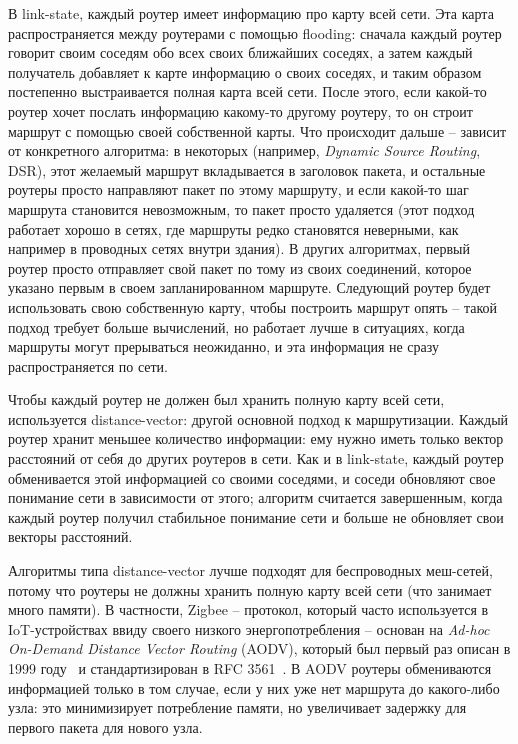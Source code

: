 \documentclass[%
]{report}
\begin{document}
В link-state, каждый роутер имеет информацию про карту всей сети.
Эта карта распространяется между роутерами с помощью flooding:
сначала каждый роутер говорит своим соседям обо всех своих ближайших соседях,
а затем каждый получатель добавляет к карте информацию о своих соседях,
и таким образом постепенно выстраивается полная карта всей сети.
После этого, если какой-то роутер хочет послать информацию какому-то другому роутеру,
то он строит маршрут с помощью своей собственной карты.
Что происходит дальше -- зависит от конкретного алгоритма:
в некоторых (например, \emph{Dynamic Source Routing}, DSR), этот желаемый маршрут вкладывается в заголовок пакета,
и остальные роутеры просто направляют пакет по этому маршруту,
и если какой-то шаг маршрута становится невозможным, то пакет просто удаляется
(этот подход работает хорошо в сетях, где маршруты редко становятся неверными,
как например в проводных сетях внутри здания).
В других алгоритмах, первый роутер просто отправляет свой пакет
по тому из своих соединений, которое указано первым в своем запланированном маршруте.
Следующий роутер будет использовать свою собственную карту, чтобы построить маршрут опять -- 
такой подход требует больше вычислений,
но работает лучше в ситуациях, когда маршруты могут прерываться неожиданно,
и эта информация не сразу распространяется по сети.

Чтобы каждый роутер не должен был хранить полную карту всей сети,
используется distance-vector: другой основной подход к маршрутизации.
Каждый роутер хранит меньшее количество информации:
ему нужно иметь только вектор расстояний от себя до других роутеров в сети.
Как и в link-state, каждый роутер обменивается этой информацией со своими соседями,
и соседи обновляют свое понимание сети в зависимости от этого;
алгоритм считается завершенным, когда каждый роутер получил стабильное понимание сети
и больше не обновляет свои векторы расстояний.

Алгоритмы типа distance-vector лучше подходят для беспроводных меш-сетей,
потому что роутеры не должны хранить полную карту всей сети (что занимает много памяти).
В частности, Zigbee -- протокол, который часто используется в IoT-устройствах ввиду своего низкого
энергопотребления --
основан на \emph{Ad-hoc On-Demand Distance Vector Routing} (AODV),
который был первый раз описан в 1999 году~\cite{perkins1999aodv}
и стандартизирован в RFC 3561~\cite{rfc3561}.
В AODV роутеры обмениваются информацией только в том случае,
если у них уже нет маршрута до какого-либо узла:
это минимизирует потребление памяти,
но увеличивает задержку для первого пакета для нового узла.
\end{document}
